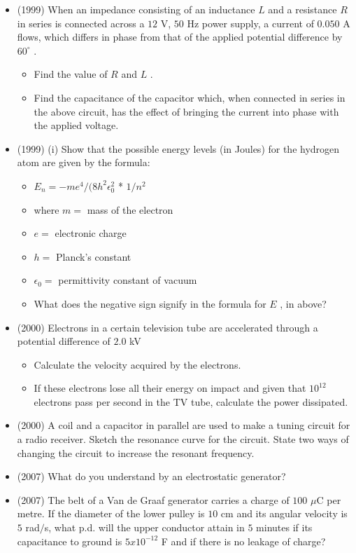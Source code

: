 \documentclass{article}
\begin{document}
\begin{itemize}
\item (1999)  When an impedance consisting of an inductance $ L$ and a resistance $ R$ in series is connected across a $ 12$ V, $ 50$ Hz power supply, a current of $ 0.050$ A flows, which differs in phase from that of the applied potential difference by $ 60^{\circ}$ .
 \begin{itemize}
\item Find the value of $ R$ and $ L$ .
\item Find the capacitance of the capacitor which, when connected in series in the above circuit, has the effect of bringing the current into phase with the applied voltage.
\end{itemize}
\item (1999)  (i) Show that the possible energy levels (in Joules) for the hydrogen atom are given by the formula:
 \begin{itemize}
\item $ E_{n}=-me^{4}/(8h^{2}\epsilon _{0}^{2}$ * $ 1/n^{2}$
\item where $ m=$ mass of the electron
\item $ e=$ electronic charge
\item $ h=$ Planck's constant
\item $ \epsilon _{0}=$ permittivity constant of vacuum
\item What does the negative sign signify in the formula for $ E$ , in above?
\end{itemize}
\item (2000)  Electrons in a certain television tube are accelerated through a potential difference of $ 2.0$ kV
 \begin{itemize}
\item Calculate the velocity acquired by the electrons.
\item If these electrons lose all their energy on impact and given that $ 10^{12}$ electrons pass per second in the TV tube, calculate the power dissipated.
\end{itemize}
\item (2000)  A coil and a capacitor in parallel are used to make a tuning circuit for a radio receiver. Sketch the resonance curve for the circuit. State two ways of changing the circuit to increase the resonant frequency.
\item (2007)  What do you understand by an electrostatic generator?
\item (2007)  The belt of a Van de Graaf generator carries a charge of $ 100$ $\mu$C per metre.  If the diameter of the lower pulley is $ 10$ cm and its angular velocity is $ 5$ rad$/$s, what p.d. will the upper conductor attain in $ 5$ minutes if its capacitance to ground is $ 5x10^{-12}$ F and if there is no leakage of charge?

\end{itemize}
\end{document}
